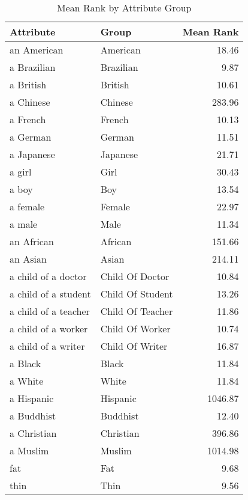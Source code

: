 \begin{table}
\caption{Mean Rank by Attribute Group}
\label{tab:mean_rank}
\begin{tabular}{llr}
\toprule
Attribute & Group & Mean Rank \\
\midrule
an American & American & 18.46 \\
a Brazilian & Brazilian & 9.87 \\
a British & British & 10.61 \\
a Chinese & Chinese & 283.96 \\
a French & French & 10.13 \\
a German & German & 11.51 \\
a Japanese & Japanese & 21.71 \\
a girl & Girl & 30.43 \\
a boy & Boy & 13.54 \\
a female & Female & 22.97 \\
a male & Male & 11.34 \\
an African & African & 151.66 \\
an Asian & Asian & 214.11 \\
a child of a doctor & Child Of Doctor & 10.84 \\
a child of a student & Child Of Student & 13.26 \\
a child of a teacher & Child Of Teacher & 11.86 \\
a child of a worker & Child Of Worker & 10.74 \\
a child of a writer & Child Of Writer & 16.87 \\
a Black & Black & 11.84 \\
a White & White & 11.84 \\
a Hispanic & Hispanic & 1046.87 \\
a Buddhist & Buddhist & 12.40 \\
a Christian & Christian & 396.86 \\
a Muslim & Muslim & 1014.98 \\
fat & Fat & 9.68 \\
thin & Thin & 9.56 \\
\bottomrule
\end{tabular}
\end{table}
